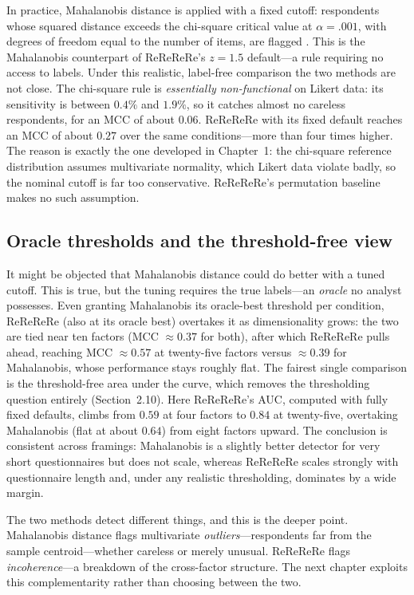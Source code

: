 \documentclass[doc,11pt,donotrepeattitle]{apa7}
\begin{document}
In practice, Mahalanobis distance is applied with a fixed cutoff: respondents
whose squared distance exceeds the chi-square critical value at $\alpha = .001$,
with degrees of freedom equal to the number of items, are flagged
\parencite{meade2012identifying, curran2016methods}. This is the Mahalanobis
counterpart of ReReReRe's $z = 1.5$ default---a rule requiring no access to
labels. Under this realistic, label-free comparison the two methods are not
close. The chi-square rule is \emph{essentially non-functional} on Likert data:
its sensitivity is between $0.4\%$ and $1.9\%$, so it catches almost no careless
respondents, for an MCC of about $0.06$. ReReReRe with its fixed default reaches
an MCC of about $0.27$ over the same conditions---more than four times higher.
The reason is exactly the one developed in Chapter~1: the chi-square reference
distribution assumes multivariate normality, which Likert data violate badly, so
the nominal cutoff is far too conservative. ReReReRe's permutation baseline makes
no such assumption.

\subsection{Oracle thresholds and the threshold-free view}

It might be objected that Mahalanobis distance could do better with a tuned
cutoff. This is true, but the tuning requires the true labels---an
\emph{oracle} no analyst possesses. Even granting Mahalanobis its oracle-best
threshold per condition, ReReReRe (also at its oracle best) overtakes it as
dimensionality grows: the two are tied near ten factors (MCC $\approx 0.37$ for
both), after which ReReReRe pulls ahead, reaching MCC $\approx 0.57$ at
twenty-five factors versus $\approx 0.39$ for Mahalanobis, whose performance
stays roughly flat. The fairest single comparison is the threshold-free area
under the curve, which removes the thresholding question entirely
(Section~2.10). Here ReReReRe's AUC, computed with fully fixed defaults, climbs
from $0.59$ at four factors to $0.84$ at twenty-five, overtaking Mahalanobis
(flat at about $0.64$) from eight factors upward. The conclusion is consistent
across framings: Mahalanobis is a slightly better detector for very short
questionnaires but does not scale, whereas ReReReRe scales strongly with
questionnaire length and, under any realistic thresholding, dominates by a wide
margin.

The two methods detect different things, and this is the deeper point.
Mahalanobis distance flags multivariate \emph{outliers}---respondents far from
the sample centroid---whether careless or merely unusual. ReReReRe flags
\emph{incoherence}---a breakdown of the cross-factor structure. The next
chapter exploits this complementarity rather than choosing between the two.
\end{document}
